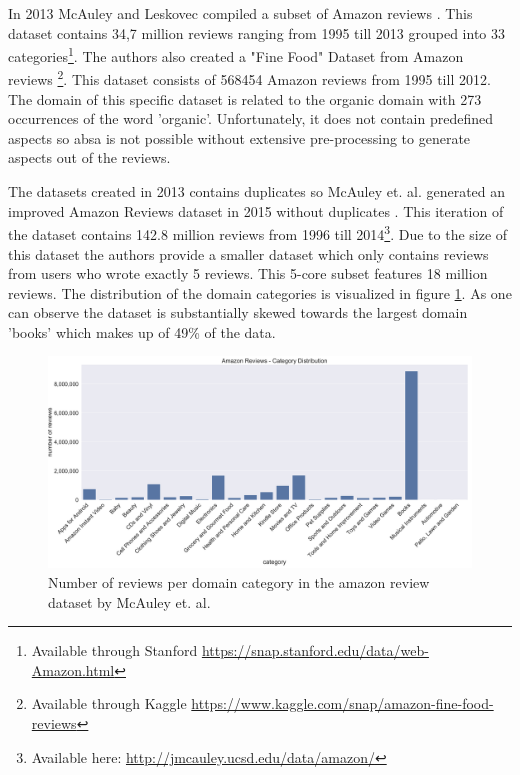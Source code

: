 In 2013 McAuley and Leskovec compiled a subset of Amazon reviews \cite{McAuley2013}. This dataset contains 34,7 million reviews ranging from 1995 till 2013 grouped into 33 categories\footnote{Available through Stanford \hyperlink{https://snap.stanford.edu/data/web-Amazon.html}{https://snap.stanford.edu/data/web-Amazon.html}}. The authors also created a "Fine Food" Dataset from Amazon reviews \cite{McAuley2013a} \footnote{Available through Kaggle \hyperlink{https://www.kaggle.com/snap/amazon-fine-food-reviews}{https://www.kaggle.com/snap/amazon-fine-food-reviews}}. This dataset consists of 568454 Amazon reviews from 1995 till 2012. The domain of this specific dataset is related to the organic domain with 273 occurrences of the word 'organic'. Unfortunately, it does not contain predefined aspects so \gls{absa} is not possible without extensive pre-processing to generate aspects out of the reviews.

The datasets created in 2013 contains duplicates so McAuley et. al. generated an improved Amazon Reviews dataset in 2015 without duplicates \cite{McAuley2015}\cite{He2016}. This iteration of the dataset contains 142.8 million reviews from 1996 till 2014\footnote{Available here: \hyperlink{http://jmcauley.ucsd.edu/data/amazon/}{http://jmcauley.ucsd.edu/data/amazon/}}. Due to the size of this dataset the authors provide a smaller dataset which only contains reviews from users who wrote exactly 5 reviews. This 5-core subset features 18 million reviews. The distribution of the domain categories is visualized in figure \ref{fig:05_amazonDatasetDistributin}. As one can observe the dataset is substantially skewed towards the largest domain 'books' which makes up of 49\% of the data.

\begin{figure}[ht]
	\centering
	\includegraphics[width=\textwidth]{figures/05_setup/05_amazonReviewsCategories}
	\caption{Number of reviews per domain category in the amazon review dataset by McAuley et. al. \cite{McAuley2015}}
	\label{fig:05_amazonDatasetDistributin}
\end{figure}

